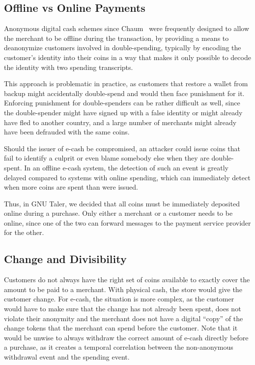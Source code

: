 \subsection{Offline vs Online Payments}

Anonymous digital cash schemes since Chaum~\cite{chaum1983blind} were frequently designed to allow
the merchant to be offline during the transaction, by providing a means to
deanonymize customers involved in double-spending, typically by encoding the
customer's identity into their coins in a way that makes it only possible to
decode the identity with two spending transcripts.

This approach is problematic in practice, as customers that restore a wallet
from backup might accidentally double-spend and would then face punishment for
it.  Enforcing punishment for double-spenders can be rather difficult as well,
since the double-spender might have signed up with a false identity or might
already have fled to another country, and a large number of merchants might already
have been defrauded with the same coins.

Should the issuer of e-cash be compromised, an attacker could issue coins that
fail to identify a culprit or even blame somebody else when they are
double-spent.  In an offline e-cash system, the detection of such an event is
greatly delayed compared to systems with online spending, which can immediately
detect when more coins are spent than were issued.

Thus, in GNU Taler, we decided that all coins must be immediately
deposited online during a purchase.  Only either a merchant or a customer
needs to be online, since one of the two can forward messages to the
payment service provider for the other.

\subsection{Change and Divisibility}

Customers  do not always have the right set of coins available to exactly cover
the amount to be paid to a merchant.  With physical cash, the store would
give the customer change.  For e-cash, the situation is more complex, as
the customer would have to make sure that the change has not already been
spent, does not violate their anonymity and the merchant does not have a
digital ``copy'' of the change tokens that the merchant can spend before the customer.  Note
that it would be unwise to always withdraw the correct amount of e-cash
directly before a purchase, as it creates a temporal correlation between the
non-anonymous withdrawal event and the spending event.

